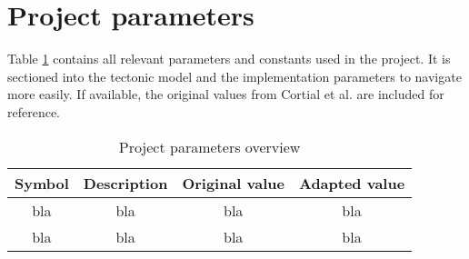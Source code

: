 \section{Project parameters}
\label{sec:projectparameters}
Table \ref{tab:project-parameters-overview} contains all relevant parameters and constants used in the project. It is sectioned into the tectonic model and the implementation parameters to navigate more easily. If available, the original values from Cortial et al. are included for reference.

\begin{table}[h!]
\centering
\begin{tabular}{cccc}
\textbf{Symbol}&\textbf{Description}&\textbf{Original value}&\textbf{Adapted value}\\
\hline
bla&bla&bla&bla\\
\hline
\hline
bla&bla&bla&bla\\
\end{tabular}
\caption{Project parameters overview}
\label{tab:project-parameters-overview}
\end{table}